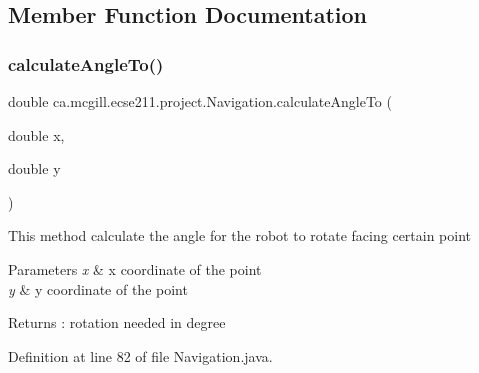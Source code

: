 \subsection{Member Function Documentation}
\mbox{\label{classca_1_1mcgill_1_1ecse211_1_1project_1_1_navigation_a4376e54162df8f123ca3b52e4fd2f38d}} 
\subsubsection{\texorpdfstring{calculate\+Angle\+To()}{calculateAngleTo()}}
{\footnotesize\ttfamily double ca.\+mcgill.\+ecse211.\+project.\+Navigation.\+calculate\+Angle\+To (\begin{DoxyParamCaption}\item[{double}]{x,  }\item[{double}]{y }\end{DoxyParamCaption})}

This method calculate the angle for the robot to rotate facing certain point 
\begin{DoxyParams}{Parameters}
{\em x} & x coordinate of the point \\
\hline
{\em y} & y coordinate of the point \\
\hline
\end{DoxyParams}
\begin{DoxyReturn}{Returns}
\+: rotation needed in degree 
\end{DoxyReturn}


Definition at line 82 of file Navigation.\+java.


